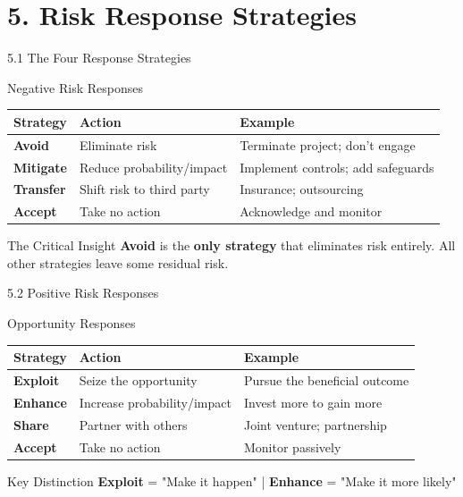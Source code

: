 \documentclass{beamer}
\begin{document}
	\section{5. Risk Response Strategies}
	
	\begin{frame}{5.1 The Four Response Strategies}
		\begin{block}{Negative Risk Responses}
			\begin{tabular}{|p{2.5cm}|p{4cm}|p{5cm}|}
				\hline
				\textbf{Strategy} & \textbf{Action} & \textbf{Example} \\
				\hline
				\textbf{Avoid} & Eliminate risk & Terminate project; don't engage \\
				\hline
				\textbf{Mitigate} & Reduce probability/impact & Implement controls; add safeguards \\
				\hline
				\textbf{Transfer} & Shift risk to third party & Insurance; outsourcing \\
				\hline
				\textbf{Accept} & Take no action & Acknowledge and monitor \\
				\hline
			\end{tabular}
		\end{block}
		
		\begin{alertblock}{The Critical Insight}
			\textbf{Avoid} is the \textbf{only strategy} that eliminates risk entirely. All other strategies leave some residual risk.
		\end{alertblock}
	\end{frame}
	
	\begin{frame}{5.2 Positive Risk Responses}
		\begin{block}{Opportunity Responses}
			\begin{tabular}{|p{2.5cm}|p{4cm}|p{5cm}|}
				\hline
				\textbf{Strategy} & \textbf{Action} & \textbf{Example} \\
				\hline
				\textbf{Exploit} & Seize the opportunity & Pursue the beneficial outcome \\
				\hline
				\textbf{Enhance} & Increase probability/impact & Invest more to gain more \\
				\hline
				\textbf{Share} & Partner with others & Joint venture; partnership \\
				\hline
				\textbf{Accept} & Take no action & Monitor passively \\
				\hline
			\end{tabular}
		\end{block}
		
		\begin{exampleblock}{Key Distinction}
			\textbf{Exploit} = "Make it happen" | \textbf{Enhance} = "Make it more likely"
		\end{exampleblock}
	\end{frame}
	
\end{document}
